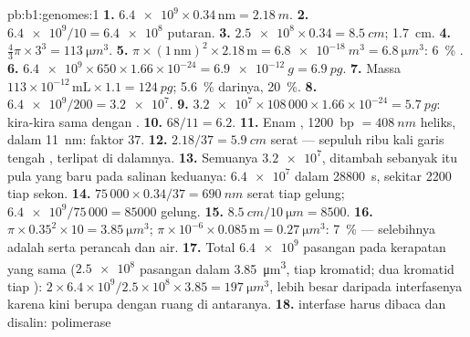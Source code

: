 \begin{solution}{pb:b1:genomes:1}
\textbf{1.} $\num{6.4e9}\times 0.34\,\mathrm{nm} = \qty{2.18}{m}$.
\textbf{2.} $\num{6.4e9}/10 = \num{6.4e8}$ putaran.
\textbf{3.} $\num{2.5e8}\times 0.34 = \qty{8.5}{cm}$; \qty{1.7}{cm}.
\textbf{4.} $\frac{4}{3}\pi\times 3^3 = \qty{113}{\micro m^3}$.
\textbf{5.} $\pi\times(1\,\mathrm{nm})^2\times 2.18\,\mathrm{m} =
\qty{6.8e-18}{m^3} = \qty{6.8}{\micro m^3}$: \qty{6}{\%} .
\textbf{6.} $\num{6.4e9}\times 650\times 1.66\times 10^{-24} =
\qty{6.9e-12}{g} = \qty{6.9}{pg}$.
\textbf{7.} Massa  $113\times 10^{-12}\,\mathrm{mL}\times 1.1 =
\qty{124}{pg}$;  \qty{5.6}{\%} darinya,  \qty{20}{\%}.
\textbf{8.} $\num{6.4e9}/200 = \num{3.2e7}$.
\textbf{9.} $\num{3.2e7}\times 108\,000\times 1.66\times 10^{-24} =
\qty{5.7}{pg}$: kira-kira sama dengan .
\textbf{10.} $68/11 = 6.2$.
\textbf{11.} Enam , \qty{1200}{bp} $= \qty{408}{nm}$ heliks,
dalam \qty{11}{nm}: faktor $37$.
\textbf{12.} $2.18/37 = \qty{5.9}{cm}$ serat --- sepuluh ribu kali
garis tengah , terlipat di dalamnya.
\textbf{13.} Semuanya $\num{3.2e7}$, ditambah sebanyak itu pula yang
baru pada salinan keduanya: $\num{6.4e7}$ dalam \qty{28800}{s}, sekitar
\num{2200} tiap sekon.
\textbf{14.} $75\,000\times 0.34/37 = \qty{690}{nm}$ serat tiap gelung;
$\num{6.4e9}/75\,000 = \num{85000}$ gelung.
\textbf{15.} $\qty{8.5}{cm}/\qty{10}{\micro m} = 8500$.
\textbf{16.} $\pi\times 0.35^2\times 10 = \qty{3.85}{\micro m^3}$; 
$\pi\times 10^{-6}\times 0.085\,\mathrm{m} = \qty{0.27}{\micro m^3}$:
\qty{7}{\%} --- selebihnya adalah  serta  perancah dan air.
\textbf{17.} Total  $\num{6.4e9}$ pasangan pada kerapatan yang sama
($\num{2.5e8}$ pasangan dalam \qty{3.85}{\micro m^3}, tiap kromatid; dua
kromatid tiap ): $2\times 6.4\times 10^9/2.5\times 10^8\times
3.85 = \qty{197}{\micro m^3}$, lebih besar daripada  interfasenya
karena  kini berupa  dengan ruang di antaranya.
\textbf{18.}  interfase harus dibaca dan disalin: polimerase

\end{solution}

